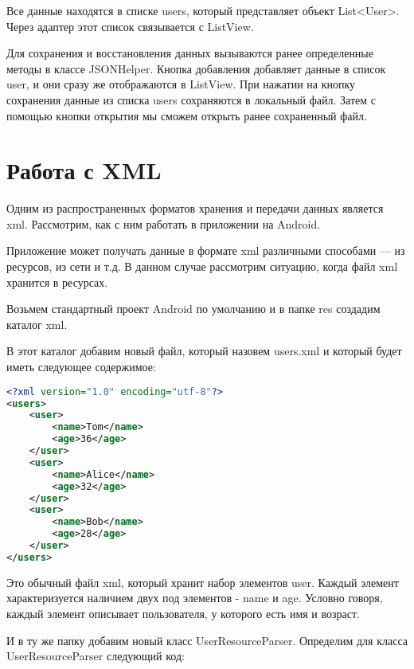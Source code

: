 Все данные находятся в списке users, который представляет объект
List<User>. Через адаптер этот список связывается с ListView.\par
Для сохранения и восстановления данных вызываются ранее определенные
методы в классе JSONHelper. Кнопка добавления добавляет данные в список
user, и они сразу же отображаются в ListView. При нажатии на кнопку
сохранения данные из списка users сохраняются в локальный файл. Затем с
помощью кнопки открытия мы сможем открыть ранее сохраненный файл.

\section{Работа с XML}
Одним из распространенных форматов хранения и передачи данных
является xml. Рассмотрим, как с ним работать в приложении на Android.\par
Приложение может получать данные в формате xml различными способами ---
из ресурсов, из сети и т.д. В данном случае рассмотрим ситуацию, когда файл
xml хранится в ресурсах.\par
Возьмем стандартный проект Android по умолчанию и в папке res создадим
каталог xml.\par
В этот каталог добавим новый файл, который назовем users.xml и который
будет иметь следующее содержимое:

\begin{lstlisting}[language=XML
	, label=lst:
	]
<?xml version="1.0" encoding="utf-8"?>
<users>
    <user>
        <name>Tom</name>
        <age>36</age>
    </user>
    <user>
        <name>Alice</name>
        <age>32</age>
    </user>
    <user>
        <name>Bob</name>
        <age>28</age>
    </user>
</users>
\end{lstlisting}

Это обычный файл xml, который хранит набор элементов user. Каждый
элемент характеризуется наличием двух под элементов - name и age. Условно
говоря, каждый элемент описывает пользователя, у которого есть имя и
возраст.\par
И в ту же папку добавим новый класс UserResourceParser.
Определим для класса UserResourceParser следующий код:

